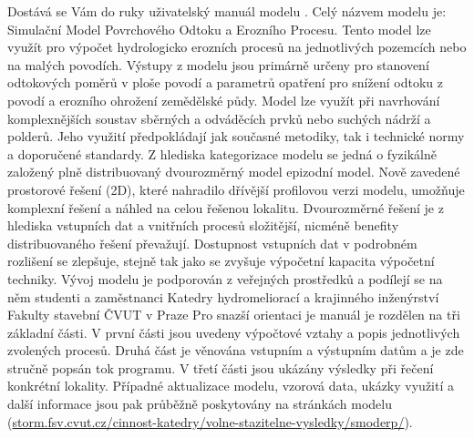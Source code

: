 


Dostává se Vám do ruky uživatelský manuál modelu \smod. Celý názvem modelu je: Simulační Model Povrchového Odtoku a Erozního Procesu. Tento model lze využít pro výpočet hydrologicko erozních procesů na jednotlivých pozemcích nebo na malých povodích. Výstupy z modelu jsou primárně určeny pro stanovení odtokových poměrů v ploše povodí a parametrů opatření pro snížení odtoku z povodí a erozního ohrožení zemědělské půdy. Model lze využít při navrhování komplexnějších soustav sběrných a odváděcích prvků nebo suchých nádrží a polderů. Jeho využití předpokládají jak současné metodiky, tak i technické normy a doporučené standardy.
Z hlediska kategorizace modelu se jedná o fyzikálně založený plně distribuovaný dvourozměrný model epizodní model. Nově zavedené prostorové řešení (2D), které nahradilo dřívější profilovou verzi modelu, umožňuje komplexní řešení a náhled na celou řešenou lokalitu. Dvourozměrné řešení je z hlediska vstupních dat a vnitřních procesů složitější, nicméně benefity distribuovaného řešení převažují. Dostupnost vstupních dat v podrobném rozlišení se zlepšuje, stejně tak jako se zvyšuje výpočetní kapacita výpočetní techniky.
Vývoj modelu je podporován z veřejných prostředků a podílejí se na něm studenti a zaměstnanci Katedry hydromeliorací a krajinného inženýrství Fakulty stavební ČVUT v Praze
Pro snazší orientaci je manuál je rozdělen na tři základní části. V první části jsou uvedeny výpočtové vztahy a popis jednotlivých zvolených procesů. Druhá část je věnována vstupním a výstupním datům a je zde stručně popsán tok programu. V třetí části jsou ukázány výsledky při řečení konkrétní lokality.
Případné aktualizace modelu, vzorová data, ukázky využití a další informace jsou pak průběžně poskytovány na stránkách  modelu
(\href{http://storm.fsv.cvut.cz/cinnost-katedry/volne-stazitelne-vysledky/smoderp/?lang=cz}{storm.fsv.cvut.cz/cinnost-katedry/volne-stazitelne-vysledky/smoderp/}).